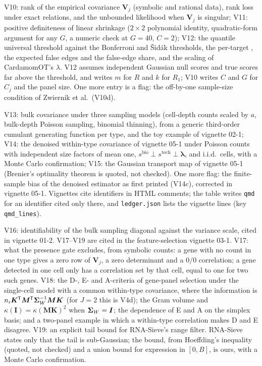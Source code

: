 \documentclass[11pt,a4paper]{article}
\begin{document}
V10: rank of the empirical covariance $\bm V_j$ (symbolic and rational data), rank loss under exact
relations, and the unbounded likelihood when $\bm V_j$ is singular; V11: positive definiteness of linear
shrinkage ($2\times2$ polynomial identity, quadratic-form argument for any $G$, a numeric check at
$G=40$, $C=2$); V12: the quantile universal threshold against the Bonferroni and Šidák thresholds, the
per-target , the expected false edges and the false-edge share, and the scaling of
CardamomOT's $\lambda$. V12 assumes independent Gaussian null scores and true scores far above the
threshold, and writes $m$ for $R$ and $k$ for $R_1$; V10 writes $C$ and $G$ for $C_j$ and the panel size.
One more entry is a flag: the off-by-one sample-size condition of Zwiernik et al.\ (V10d).

V13: bulk covariance under three sampling models (cell-depth counts scaled by $a$, bulk-depth Poisson
sampling, binomial thinning), from a generic third-order cumulant generating function per type, and the toy
example of vignette 02-1; V14: the denoised within-type covariance of vignette 05-1 under Poisson counts with
independent size factors of mean one, $s^{\mathrm{bio}}\perp s^{\mathrm{tech}}\perp\bm\lambda$, and i.i.d.\ cells, with a
Monte Carlo confirmation; V15: the Gaussian transport map of vignette 05-1 (Brenier's optimality theorem is
quoted, not checked). One more flag: the finite-sample bias of the denoised estimator as first printed (V14c),
corrected in vignette 05-1. Vignettes cite identifiers in HTML comments; the table writes \texttt{qmd} for an
identifier cited only there, and \texttt{ledger.json} lists the vignette lines (key \texttt{qmd\_lines}).

V16: identifiability of the bulk sampling diagonal against the variance scale, cited in vignette 01-2.
V17--V19 are cited in the feature-selection vignette 03-1. V17: what the presence gate excludes, from symbolic
counts: a gene with no count in one type gives a zero row of $\bm V_j$, a zero determinant and a $0/0$
correlation; a gene detected in one cell only has a correlation set by that cell, equal to one for two such
genes. V18: the D-, E- and A-criteria of gene-panel selection under the single-cell model with a common
within-type covariance, where the information is $n_i\bm K^{\mkern-1.5mu\mathsf{T}}\bm M^{\mkern-1.5mu\mathsf{T}}\bm{\Sigma}_W^{-1}\bm M\bm K$ (for $J=2$ this
is V4d); the Gram volume and $\kappa(\bm I)=\kappa(\bm M\bm K)^2$ when $\bm{\Sigma}_W=\bm I$; the dependence of E
and A on the simplex basis; and a two-panel example in which a within-type correlation makes D and E disagree.
V19: an explicit tail bound for RNA-Sieve's range filter. RNA-Sieve states only that the tail is
sub-Gaussian; the bound, from Hoeffding's inequality (quoted, not checked) and a union bound for expression in
$[0,B]$, is ours, with a Monte Carlo confirmation.
\end{document}
